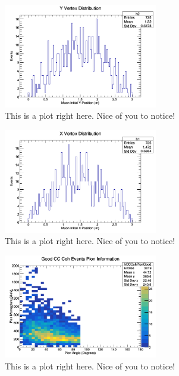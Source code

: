 \documentclass[11pt]{article}
\begin{document}
\begin{figure}[H]
\centering
\includegraphics[width=0.6\textwidth]{OldNMReinSehgalImages/3-YVertexDistributionNMORS.png}
\caption{This is a plot right here. Nice of you to notice!}
\end{figure}

\begin{figure}[H]
\centering
\includegraphics[width=0.6\textwidth]{OldNMReinSehgalImages/4-XVertexDistributionNMORS.png}
\caption{This is a plot right here. Nice of you to notice!}
\end{figure}

\begin{figure}[H]
\centering
\includegraphics[width=0.6\textwidth]{OldNMReinSehgalImages/5-GoodCCCohPionInfoNMORS.png}
\caption{This is a plot right here. Nice of you to notice!}
\end{figure}
\end{document}
